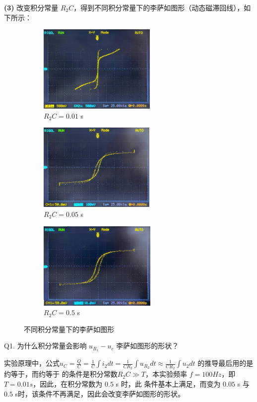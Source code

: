 \documentclass[UTF8]{article}
\theoremstyle{MyLineTheoremStyle} %
\theoremstyle{MyBlockTheoremStyle} %
\theoremstyle{MySubsubsectionStyle} %
\begin{document}
\noindent \textbf{(3)} 改变积分常量 $R_2 C$，得到不同积分常量下的李萨如图形（动态磁滞回线），如下所示：
\begin{figure}[H]\centering
\begin{subfigure}[b]{0.33\columnwidth}\centering
    \includegraphics[height=120pt]{assets/1.1/(2)/IMG_1796.JPG}
    \caption{$R_2C = 0.01$ s}
\end{subfigure}\hfill
\begin{subfigure}[b]{0.33\columnwidth}\centering
    \includegraphics[height=120pt]{assets/1.1/(2)/IMG_1794.JPG}
    \caption{$R_2C = 0.05$ s}
\end{subfigure}
\begin{subfigure}[b]{0.33\columnwidth}\centering
    \includegraphics[height=120pt]{assets/1.1/(2)/IMG_1795.JPG}
    \caption{$R_2C = 0.5$ s}
\end{subfigure}
\caption{不同积分常量下的李萨如图形}
\end{figure}

\noindent Q1. 为什么积分常量会影响 $u_{R_1}-u_c$ 李萨如图形的形状？\par
实验原理中，公式${u_C} = \frac{Q}{C} = \frac{1}{C}\int {{i_2}dt}  = \frac{1}{{C{R_2}}}\int {{u_{{R_2}}}dt}  \approx \frac{1}{{C{R_2}}}\int {{u_2}dt}$
的推导最后用的是约等于，而约等于
的条件是积分常数$R_2 C \gg T$，本实验频率 $f=100Hz$，即 $T=0.01s$，因此，在积分常数为 $0.5$ s 时，此
条件基本上满足，而变为 $0.05$ s 与$ 0.5$ s时，该条件不再满足，因此会改变李萨如图形的形状。
\end{document}

